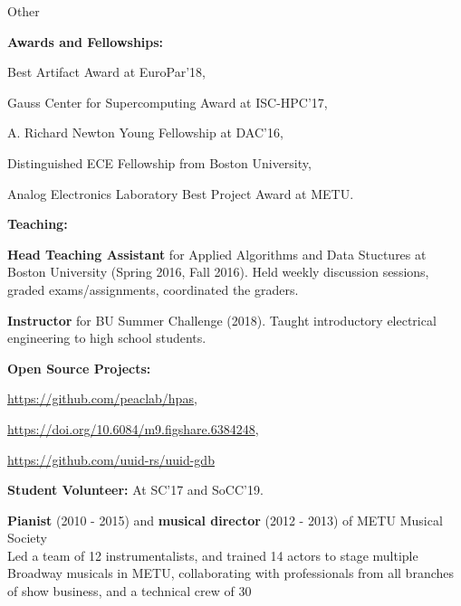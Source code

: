 \documentclass{resume}
\begin{document}
\begin{rSection}{Other} \itemsep -3pt
\item {\bf Awards and Fellowships:}
  \begin{rList}
  \item Best Artifact Award at EuroPar'18,
  \item Gauss Center for Supercomputing Award at ISC-HPC'17,
  \item A. Richard Newton Young Fellowship at DAC'16,
  \item Distinguished ECE Fellowship from Boston University,
  \item Analog Electronics Laboratory Best Project Award at METU.
  \end{rList}
\item {\bf Teaching:}
  \begin{rList}
  \item {\bf Head Teaching Assistant} for Applied Algorithms and Data Stuctures
    at Boston University (Spring 2016, Fall 2016). Held weekly discussion
    sessions, graded exams/assignments, coordinated the graders.
  \item {\bf Instructor} for BU Summer Challenge (2018). Taught introductory
    electrical engineering to high school students.
  \end{rList}
\item {\bf Open Source Projects:}
  \begin{rList}
  \item \url{https://github.com/peaclab/hpas},
  \item \url{https://doi.org/10.6084/m9.figshare.6384248},
  \item \url{https://github.com/uuid-rs/uuid-gdb}
  \end{rList}
\item {\bf Student Volunteer:} At SC'17 and SoCC'19.
\item {\bf Pianist} (2010 - 2015) and {\bf musical director} (2012 - 2013) of
  METU Musical Society \\
  Led a team of 12 instrumentalists, and trained 14 actors to stage multiple
  Broadway musicals in METU, collaborating with professionals from all branches
  of show business, and a technical crew of 30

\end{rSection}
\end{document}

